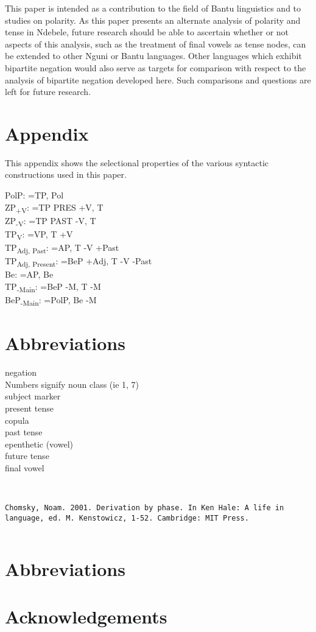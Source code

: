 \documentclass[output=paper]{langsci/langscibook}
\begin{document}
This paper is intended as a contribution to the field of Bantu linguistics and to studies on polarity. As this paper presents an alternate analysis of polarity and tense in Ndebele, future research should be able to ascertain whether or not aspects of this analysis, such as the treatment of final vowels as tense nodes, can be extended to other Nguni or Bantu languages. Other languages which exhibit bipartite negation would also serve as targets for comparison with respect to the analysis of bipartite negation developed here. Such comparisons and questions are left for future research. 
\vspace{5 mm}

\section*{Appendix}

This appendix shows the selectional properties of the various  syntactic constructions used in this paper.

PolP: =TP, Pol
\\
ZP\textsubscript{+V}: =TP PRES +V, T 
\\
ZP\textsubscript{-V}: =TP PAST -V, T 
\\
TP\textsubscript{V}: =VP, T +V
\\
TP\textsubscript{Adj, Past}: =AP, T -V +Past
\\
TP\textsubscript{Adj, Present}: =BeP +Adj, T -V -Past
\\
Be: =AP, Be 
\\
TP\textsubscript{-Main}: =BeP -M, T -M
\\
BeP\textsubscript{-Main}: =PolP, Be -M


\section*{Abbreviations}

 \quad negation
\\
Numbers \quad signify noun class (ie 1, 7)
\\
 \quad subject marker
\\
 \quad present tense
\\
 \quad copula
\\
 \quad past tense
\\
 \quad epenthetic (vowel)
\\
 \quad future tense
\\
 \quad final vowel


\begin{verbatim}


Chomsky, Noam. 2001. Derivation by phase. In Ken Hale: A life in language, ed. M. Kenstowicz, 1-52. Cambridge: MIT Press.


\end{verbatim}





\section*{Abbreviations}
\section*{Acknowledgements}

\printbibliography[heading=subbibliography,notkeyword=this]
\end{document}

